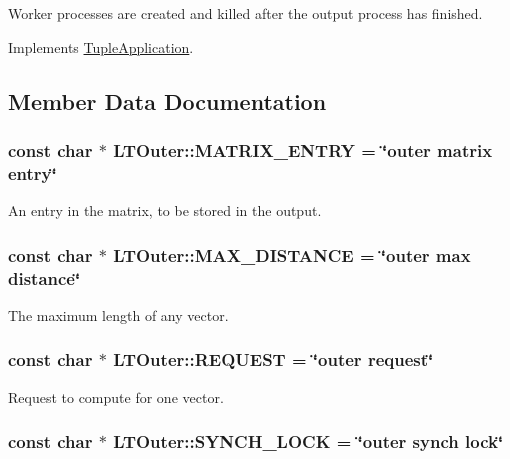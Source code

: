Worker processes are created and killed after the output process has finished. 

Implements \hyperlink{class_tuple_application_ef6ae8bb1d697e4ed038b43320183c89}{TupleApplication}.

\subsection{Member Data Documentation}
\hypertarget{class_l_t_outer_b1e7e3c0471f26305f697f1324f769fa}{
\subsubsection[{MATRIX\_\-ENTRY}]{\setlength{\rightskip}{0pt plus 5cm}const char $\ast$ {\bf LTOuter::MATRIX\_\-ENTRY} = \char`\"{}outer matrix entry\char`\"{}}}
\label{class_l_t_outer_b1e7e3c0471f26305f697f1324f769fa}


An entry in the matrix, to be stored in the output. \hypertarget{class_l_t_outer_3a27e2c7371866691ebe47def5db76fa}{
\subsubsection[{MAX\_\-DISTANCE}]{\setlength{\rightskip}{0pt plus 5cm}const char $\ast$ {\bf LTOuter::MAX\_\-DISTANCE} = \char`\"{}outer max distance\char`\"{}}}
\label{class_l_t_outer_3a27e2c7371866691ebe47def5db76fa}


The maximum length of any vector. \hypertarget{class_l_t_outer_6941f4f6ba366cff85accf2adc955a66}{
\subsubsection[{REQUEST}]{\setlength{\rightskip}{0pt plus 5cm}const char $\ast$ {\bf LTOuter::REQUEST} = \char`\"{}outer request\char`\"{}}}
\label{class_l_t_outer_6941f4f6ba366cff85accf2adc955a66}


Request to compute for one vector. \hypertarget{class_l_t_outer_39056ff036f5138e2f7529c804698bb4}{
\subsubsection[{SYNCH\_\-LOCK}]{\setlength{\rightskip}{0pt plus 5cm}const char $\ast$ {\bf LTOuter::SYNCH\_\-LOCK} = \char`\"{}outer synch lock\char`\"{}}}
\label{class_l_t_outer_39056ff036f5138e2f7529c804698bb4}


